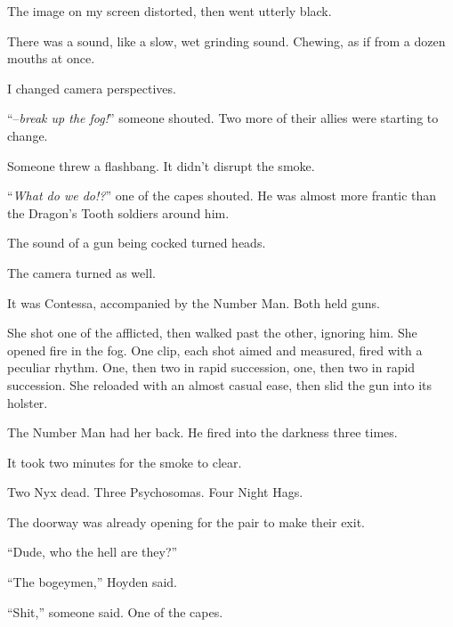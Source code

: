 The image on my screen distorted, then went utterly black.



There was a sound, like a slow, wet grinding sound.  Chewing, as if from a dozen mouths at once.



I changed camera perspectives.



``--\emph{break up the fog!}''  someone shouted.  Two more of their allies were starting to change.



Someone threw a flashbang.  It didn't disrupt the smoke.



``\emph{What do we do!?}'' one of the capes shouted.  He was almost more frantic than the Dragon's Tooth soldiers around him.



The sound of a gun being cocked turned heads.



The camera turned as well.



It was Contessa, accompanied by the Number Man.  Both held guns.



She shot one of the afflicted, then walked past the other, ignoring him.  She opened fire in the fog.  One clip, each shot aimed and measured, fired with a peculiar rhythm.  One, then two in rapid succession, one, then two in rapid succession.  She reloaded with an almost casual ease, then slid the gun into its holster.



The Number Man had her back.  He fired into the darkness three times.



It took two minutes for the smoke to clear.



Two Nyx dead.  Three Psychosomas.  Four Night Hags.



The doorway was already opening for the pair to make their exit.



``Dude, who the hell are they?''



``The bogeymen,'' Hoyden said.



``Shit,'' someone said.  One of the capes.



